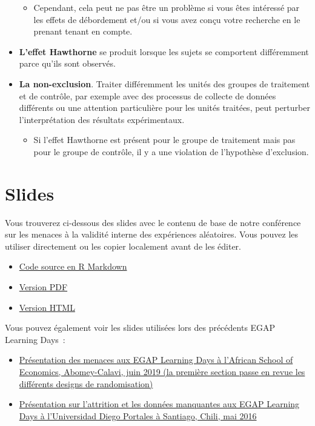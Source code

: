 \documentclass[
  12pt,
]{book}
\providecommand{\tightlist}{%
  \setlength{\itemsep}{0pt}\setlength{\parskip}{0pt}}
\begin{document}
\begin{itemize}
  \begin{itemize}
  \tightlist
  \item
    Cependant, cela peut ne pas être un problème si vous êtes intéressé par les effets de débordement et/ou si vous avez conçu votre recherche en le prenant tenant en compte.
  \end{itemize}
\item
  \textbf{L'effet Hawthorne} se produit lorsque les sujets se comportent différemment parce qu'ils sont observés.
\item
  \textbf{La non-exclusion}. Traiter différemment les unités des groupes de traitement et de contrôle, par exemple avec des processus de collecte de données différents ou une attention particulière pour les unités traitées, peut perturber l'interprétation des résultats expérimentaux.

  \begin{itemize}
  \tightlist
  \item
    Si l'effet Hawthorne est présent pour le groupe de traitement mais pas pour le groupe de contrôle, il y a une violation de l'hypothèse d'exclusion.
  \end{itemize}
\end{itemize}

\hypertarget{slides-7}{%
\section{Slides}\label{slides-7}}

Vous trouverez ci-dessous des slides avec le contenu de base de notre conférence sur les menaces à la validité interne des expériences aléatoires. Vous pouvez les utiliser directement ou les copier localement avant de les éditer.

\begin{itemize}
\item
  \href{https://egap.github.io/learningdays-resources/Slides/threats-slides.Rmd}{Code source en R Markdown}
\item
  \href{https://egap.github.io/learningdays-resources/Slides/threats-slides.pdf}{Version PDF}
\item
  \href{https://egap.github.io/learningdays-resources/Slides/threats-slides.html}{Version HTML}
\end{itemize}

Vous pouvez également voir les slides utilisées lors des précédents EGAP Learning Days~:

\begin{itemize}
\item
  \href{https://egap.github.io/learningdays-resources/Slides/Examples/threats-benin.pdf}{Présentation des menaces aux EGAP Learning Days à l'African School of Economics, Abomey-Calavi, juin 2019 (la première section passe en revue les différents designs de randomisation)}
\item
  \href{https://egap.github.io/learningdays-resources/Slides/Examples/threats-santiago.pdf}{Présentation sur l'attrition et les données manquantes aux EGAP Learning Days à l'Universidad Diego Portales à Santiago, Chili, mai 2016}
\end{itemize}
\end{document}
